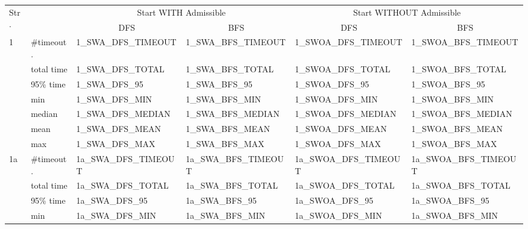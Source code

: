 

\begin{table}
\centering
\begin{tabular}{|l|l|l|l|l|l|}
\hline
\multirow{2}{*}{Str.} &            & \multicolumn{2}{c|}{Start WITH Admissible}          & \multicolumn{2}{c|}{Start WITHOUT Admissible}        \\
\cline{3-6}
                      &            & \multicolumn{1}{c|}{DFS} & \multicolumn{1}{c|}{BFS} & \multicolumn{1}{c|}{DFS} & \multicolumn{1}{c|}{BFS}  \\
\hline
\hline
\multirow{7}{*}{1}    & \#timeout. & 1_SWA_DFS_TIMEOUT     & 1_SWA_BFS_TIMEOUT     & 1_SWOA_DFS_TIMEOUT    & 1_SWOA_BFS_TIMEOUT     \\
                      & total time & 1_SWA_DFS_TOTAL       & 1_SWA_BFS_TOTAL       & 1_SWOA_DFS_TOTAL      & 1_SWOA_BFS_TOTAL       \\
                      & 95\% time  & 1_SWA_DFS_95          & 1_SWA_BFS_95          & 1_SWOA_DFS_95         & 1_SWOA_BFS_95          \\
\cline{2-6}
                      & min        & 1_SWA_DFS_MIN         & 1_SWA_BFS_MIN         & 1_SWOA_DFS_MIN        & 1_SWOA_BFS_MIN         \\
                      & median     & 1_SWA_DFS_MEDIAN      & 1_SWA_BFS_MEDIAN      & 1_SWOA_DFS_MEDIAN     & 1_SWOA_BFS_MEDIAN      \\
                      & mean       & 1_SWA_DFS_MEAN        & 1_SWA_BFS_MEAN        & 1_SWOA_DFS_MEAN       & 1_SWOA_BFS_MEAN        \\
                      & max        & 1_SWA_DFS_MAX         & 1_SWA_BFS_MAX         & 1_SWOA_DFS_MAX        & 1_SWOA_BFS_MAX         \\
\hline
\hline
\multirow{7}{*}{1a}   & \#timeout. & 1a_SWA_DFS_TIMEOUT    & 1a_SWA_BFS_TIMEOUT    & 1a_SWOA_DFS_TIMEOUT   & 1a_SWOA_BFS_TIMEOUT    \\
                      & total time & 1a_SWA_DFS_TOTAL      & 1a_SWA_BFS_TOTAL      & 1a_SWOA_DFS_TOTAL     & 1a_SWOA_BFS_TOTAL      \\
                      & 95\% time  & 1a_SWA_DFS_95         & 1a_SWA_BFS_95         & 1a_SWOA_DFS_95        & 1a_SWOA_BFS_95         \\
\cline{2-6}
                      & min        & 1a_SWA_DFS_MIN        & 1a_SWA_BFS_MIN        & 1a_SWOA_DFS_MIN       & 1a_SWOA_BFS_MIN        \\

\end{tabular}
\end{table}
